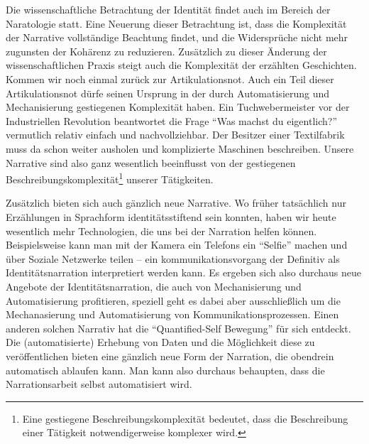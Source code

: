 Die wissenschaftliche Betrachtung der Identität findet auch im Bereich der Naratologie statt.
Eine Neuerung dieser Betrachtung ist, dass die Komplexität der Narrative vollständige Beachtung findet, und die Widersprüche nicht mehr zugunsten der Kohärenz zu reduzieren\parencite[164]{kraus}.
Zusätzlich zu dieser Änderung der wissenschaftlichen Praxis steigt auch die Komplexität der erzählten Geschichten.
Kommen wir noch einmal zurück zur Artikulationsnot. Auch ein Teil dieser Artikulationsnot dürfe seinen Ursprung in der durch Automatisierung und Mechanisierung gestiegenen Komplexität haben.
Ein Tuchwebermeister vor der Industriellen Revolution beantwortet die Frage \enquote{Was machst du eigentlich?} vermutlich relativ einfach und nachvollziehbar.
Der Besitzer einer Textilfabrik muss da schon weiter ausholen und komplizierte Maschinen beschreiben.
Unsere Narrative sind also ganz wesentlich beeinflusst von der gestiegenen Beschreibungskomplexität\footnote{Eine gestiegene Beschreibungskomplexität bedeutet, dass die Beschreibung einer Tätigkeit notwendigerweise komplexer wird.} unserer Tätigkeiten.

Zusätzlich bieten sich auch gänzlich neue Narrative.
Wo früher tatsächlich nur Erzählungen in Sprachform identitätsstiftend sein konnten, haben wir heute wesentlich mehr Technologien, die uns bei der Narration helfen können.
Beispielsweise kann man mit der Kamera ein Telefons ein \enquote{Selfie} machen und über Soziale Netzwerke teilen – ein kommunikationsvorgang der Definitiv als Identitätsnarration interpretiert werden kann\parencite{iqani}.
Es ergeben sich also durchaus neue Angebote der Identitätsnarration, die auch von Mechanisierung und Automatisierung profitieren, speziell geht es dabei aber ausschließlich um die Mechanasierung und Automatisierung von Kommunikationsprozessen.
Einen anderen solchen Narrativ hat die \enquote{Quantified-Self Bewegung} für sich entdeckt\parencite{bellinger}.
Die (automatisierte) Erhebung von Daten und die Möglichkeit diese zu veröffentlichen bieten eine gänzlich neue Form der Narration, die obendrein automatisch ablaufen kann.
Man kann also durchaus behaupten, dass die Narrationsarbeit selbst automatisiert wird.


